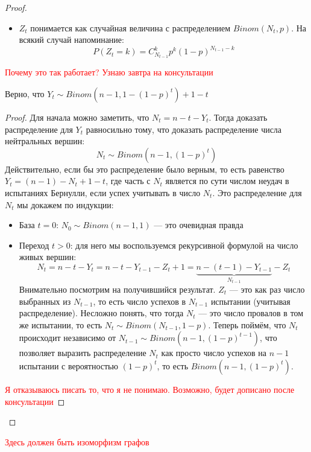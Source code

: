 \begin{proof}
\begin{itemize}
		\item $Z_t$ понимается как случайная величина с распределением $Binom(N_t, p)$. На всякий случай напоминание:
		\[
			P(Z_t = k) = C_{N_{t - 1}}^k p^k (1 - p)^{N_{t - 1} - k}
		\]
	\end{itemize}
	\textcolor{red}{Почему это так работает? Узнаю завтра на консультации}
	\begin{lemma}
		Верно, что $Y_t \sim Binom(n - 1, 1 - (1 - p)^t) + 1 - t$
	\end{lemma}

	\begin{proof}
		Для начала можно заметить, что $N_t = n - t - Y_t$. Тогда доказать распределение для $Y_t$ равносильно тому, что доказать распределение числа нейтральных вершин:
		\[
			N_t \sim Binom(n - 1, (1 - p)^t)
		\]
		Действительно, если бы это распределение было верным, то есть равенство $Y_t = (n - 1) - N_t + 1 - t$, где часть с $N_t$ является по сути числом неудач в испытаниях Бернулли, если успех учитывать в число $N_t$. Это распределение для $N_t$ мы докажем по индукции:
		\begin{itemize}
			\item База $t = 0$: $N_0 \sim Binom(n - 1, 1)$ --- это очевидная правда
			
			\item Переход $t > 0$: для него мы воспользуемся рекурсивной формулой на число живых вершин:
			\[
				N_t = n - t - Y_t = n - t - Y_{t - 1} - Z_t + 1 = \underbrace{n - (t - 1) - Y_{t - 1}}_{N_{t - 1}} - Z_t
			\]
			Внимательно посмотрим на получившийся результат. $Z_t$ --- это как раз число выбранных из $N_{t - 1}$, то есть число успехов в $N_{t - 1}$ испытании (учитывая распределение). Несложно понять, что тогда $N_t$ --- это число провалов в том же испытании, то есть $N_t \sim Binom(N_{t - 1}, 1 - p)$. Теперь поймём, что $N_t$ происходит независимо от $N_{t - 1} \sim Binom(n - 1, (1 - p)^{t - 1})$, что позволяет выразить распределение $N_t$ как просто число успехов на $n - 1$ испытании с вероятностью $(1 - p)^t$, то есть $Binom(n - 1, (1 - p)^t)$.
		\end{itemize}
		\textcolor{red}{Я отказываюсь писать то, что я не понимаю. Возможно, будет дописано после консультации}
	\end{proof}
\end{proof}

\textcolor{red}{Здесь должен быть изоморфизм графов}